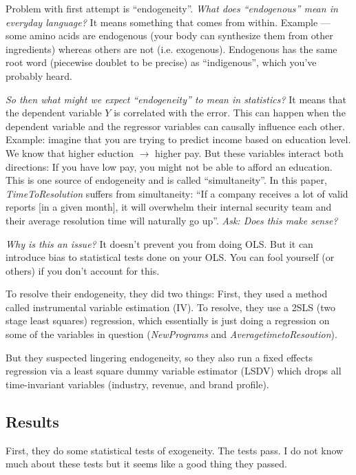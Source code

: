 \documentclass[11pt]{article}
\begin{document}
Problem with first attempt is ``endogeneity''. {\it What does ``endogenous'' mean in everyday language?} It means something that comes from within. Example --- some amino acids are endogenous (your body can synthesize them from other ingredients) whereas others are not (i.e. exogenous). Endogenous has the same root word (piecewise doublet to be precise) as ``indigenous'', which you've probably heard. 


{\it So then what might we expect ``endogeneity'' to mean in statistics?} It means that the dependent variable $Y$ is correlated with the error. This can happen when the dependent variable and the regressor variables can causally influence each other. Example: imagine that you are trying to predict income based on education level. We know that higher eduction $\rightarrow$ higher pay. But these variables interact both directions: If you have low pay, you might not be able to afford an education. This is one source of endogeneity and is called ``simultaneity''. In this paper, {\it TimeToResolution} suffers from simultaneity: ``If a company receives a lot of valid reports [in a given month], it will overwhelm their internal security team and their average resolution time will naturally go up''. {\it Ask: Does this make sense?}


{\it Why is this an issue?} It doesn't prevent you from doing OLS. But it can introduce bias to statistical tests done on your OLS. You can fool yourself (or others) if you don't account for this. 

To resolve their endogeneity, they did two things: First, they used a method called instrumental variable estimation (IV). To resolve, they use a 2SLS (two stage least squares) regression, which essentially is just doing a regression on some of the variables in question ({\it NewPrograms} and {\it AveragetimetoResoution}).


But they suspected lingering endogeneity, so they also run a fixed effects regression via a least square dummy variable estimator (LSDV) which drops all time-invariant variables (industry, revenue, and brand profile).

\subsection{Results}

First, they do some statistical tests of exogeneity. The tests pass. I do not know much about these tests but it seems like a good thing they passed. 
\end{document}
